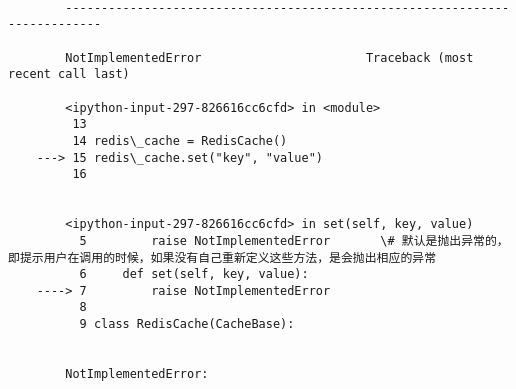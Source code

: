 \documentclass[11pt]{article}
\begin{document}
    \begin{Verbatim}[commandchars=\\\{\}]

        ---------------------------------------------------------------------------

        NotImplementedError                       Traceback (most recent call last)

        <ipython-input-297-826616cc6cfd> in <module>
         13 
         14 redis\_cache = RedisCache()
    ---> 15 redis\_cache.set("key", "value")
         16 
    

        <ipython-input-297-826616cc6cfd> in set(self, key, value)
          5         raise NotImplementedError       \# 默认是抛出异常的，即提示用户在调用的时候，如果没有自己重新定义这些方法，是会抛出相应的异常
          6     def set(self, key, value):
    ----> 7         raise NotImplementedError
          8 
          9 class RedisCache(CacheBase):
    

        NotImplementedError: 

    \end{Verbatim}
\end{document}

